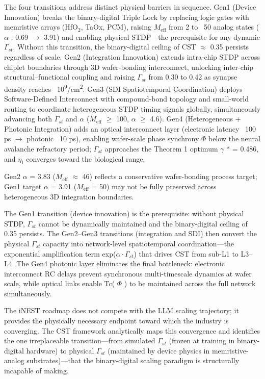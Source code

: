 \documentclass[a4paper,12pt]{article}
\providecommand{\textsubscript}[1]{\ensuremath{_{\text{#1}}}}
\begin{document}
The four transitions address distinct physical barriers in sequence.
Gen1 (Device Innovation) breaks the binary-digital Triple Lock by replacing logic gates with memristive arrays (HfO\textsubscript{2}, TaOx, PCM), raising $M_{\text{eff}}$ from 2 to ~50 analog states ( $\alpha$ : 0.69 $\rightarrow$ 3.91) and enabling physical STDP---the prerequisite for any dynamic $\Gamma_{st}$.
Without this transition, the binary-digital ceiling of CST  $\approx$  0.35 persists regardless of scale.
Gen2 (Integration Innovation) extends intra-chip STDP across chiplet boundaries through 3D wafer-bonding interconnect, unlocking inter-chip structural--functional coupling and raising $\Gamma_{st}$ from 0.30 to 0.42 as synapse density reaches ~10\textsuperscript{9}/cm\textsuperscript{2}.
Gen3 (SDI Spatiotemporal Coordination) deploys Software-Defined Interconnect with compound-bond topology and small-world routing to coordinate heterogeneous STDP timing signals globally, simultaneously advancing both $\Gamma_{st}$ and  $\alpha$  ($M_{\text{eff}}$  $\geq$  100,  $\alpha$   $\geq$  4.6).
Gen4 (Heterogeneous + Photonic Integration) adds an optical interconnect layer (electronic latency ~100 ps  $\rightarrow$  photonic ~10 ps), enabling wafer-scale phase synchrony  $\Phi$  below the neural avalanche refractory period; $\Gamma_{st}$ approaches the Theorem 1 optimum  $\gamma$ * = 0.486, and $\eta_{\text{I}}$ converges toward the biological range.

\dag{}Gen2  $\alpha$  = 3.83 ($M_{\text{eff}}$  $\approx$  46) reflects a conservative wafer-bonding process target; Gen1 target  $\alpha$  = 3.91 ($M_{\text{eff}}$ = 50) may not be fully preserved across heterogeneous 3D integration boundaries.

The Gen1 transition (device innovation) is the prerequisite: without physical STDP, $\Gamma_{st}$ cannot be dynamically maintained and the binary-digital ceiling of 0.35 persists.
The Gen2--Gen3 transitions (integration and SDI) then convert the physical $\Gamma_{st}$ capacity into network-level spatiotemporal coordination---the exponential amplification term exp($\alpha \cdot \Gamma_{st}$) that drives CST from sub-L1 to L3--L4.
The Gen4 photonic layer eliminates the final bottleneck: electronic interconnect RC delays prevent synchronous multi-timescale dynamics at wafer scale, while optical links enable Tc( $\Phi$ ) to be maintained across the full network simultaneously.

The iNEST roadmap does not compete with the LLM scaling trajectory; it provides the physically necessary endpoint toward which the industry is converging.
The CST framework analytically maps this convergence and identifies the one irreplaceable transition---from simulated $\Gamma_{st}$ (frozen at training in binary-digital hardware) to physical $\Gamma_{st}$ (maintained by device physics in memristive-analog substrates)---that the binary-digital scaling paradigm is structurally incapable of making.
\end{document}
